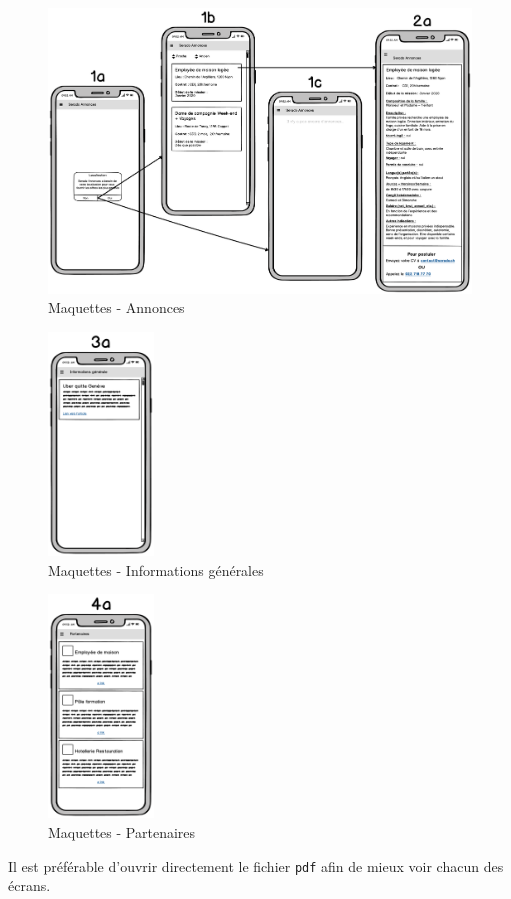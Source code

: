 \documentclass[french]{report}
\begin{document}
\begin{figure}[H]
    \centering
    \includegraphics[width=\textwidth]{../mocks/1-2.pdf}
    \caption{Maquettes - Annonces}
    \label{fig:mockup_ads}
\end{figure}

\begin{figure}[H]
    \centering
    \includegraphics[width=0.25\textwidth]{../mocks/3.pdf}
    \caption{Maquettes - Informations générales}
    \label{fig:mockups_infos}
\end{figure}

\begin{figure}[H]
    \centering
    \includegraphics[width=0.25\textwidth]{../mocks/4.pdf}
    \caption{Maquettes - Partenaires}
    \label{fig:mockups_partners}
\end{figure}

Il est préférable d'ouvrir directement le fichier \verb|pdf| afin de mieux voir
chacun des écrans.
\end{document}
